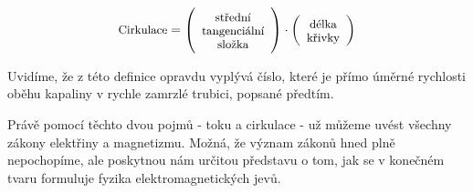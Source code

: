     
    \begin{equation}\label{fyz:eq_fey_elmag05}
      \renewcommand\arraystretch{0.6} \setlength\minrowclearance{2.4pt}
      \small
      \text{Cirkulace} = 
        \left(\begin{array}{c}
          \text{střední}      \\
          \text{tangenciální} \\
          \text{složka}
         \end{array}
       \right)\cdot
       \left(\begin{array}{c}
          \text{délka}      \\
          \text{křivky}
        \end{array}
       \right)
    \end{equation}

    Uvidíme, že z této definice opravdu vyplývá číslo, které je přímo úměrné rychlosti oběhu 
    kapaliny v rychle zamrzlé trubici, popsané předtím.
    
    Právě pomocí těchto dvou pojmů - toku a cirkulace - už můžeme uvést všechny zákony elektřiny a
    magnetizmu. Možná, že význam zákonů hned plně nepochopíme, ale poskytnou nám určitou představu 
    o tom, jak se v konečném tvaru formuluje fyzika elektromagnetických jevů.

  
